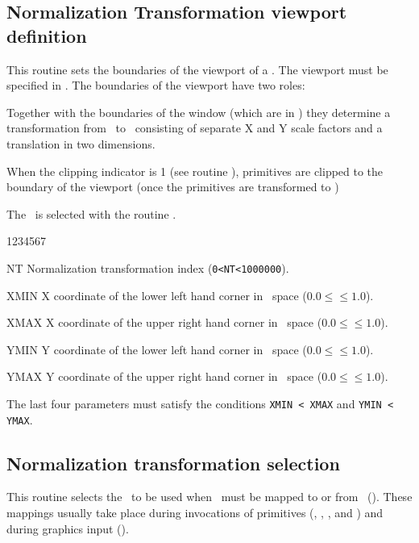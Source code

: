 \subsection{Normalization Transformation viewport definition}
\Action
This routine sets the boundaries of the viewport of a \NT. The viewport must be
specified in \NDC. The boundaries of the viewport have
two roles:
\begin{OL}
\item Together with the boundaries of the window (which are in \WC)
      they determine a transformation from \WC~to \NDC~consisting of
      separate X and Y scale factors and a translation in two dimensions.
\item When the clipping indicator is 1 (see routine ), primitives
      are clipped to the boundary of the viewport (once the primitives are
      transformed to \NDC)
\end{OL}
The \NT~is selected with the routine .
\Pdesc
\begin{DLtt}{1234567}
\item[NT]   Normalization transformation index ({\tt 0<NT<1000000}).
\item[XMIN] X coordinate of the lower left hand corner in \dc~space
            ($0.0 \leq $$\leq 1.0$).
\item[XMAX] X coordinate of the upper right hand corner in \dc~space
            ($0.0 \leq $$\leq 1.0$).
\item[YMIN] Y coordinate of the lower left hand corner in \dc~space
            ($0.0 \leq $$\leq 1.0$).
\item[YMAX] Y coordinate of the upper right hand corner in \dc~space
            ($0.0 \leq $$\leq 1.0$).
\end{DLtt}
The last four parameters must satisfy the conditions {\tt XMIN < XMAX} and
{\tt YMIN < YMAX}.
%
\subsection{Normalization transformation selection}
\Action
This routine selects the \NT~to be used when \WC~must be mapped
to or from \NDC~(\ndc). These mappings usually take
place during invocations of primitives (, , , and
) and during graphics input ().

